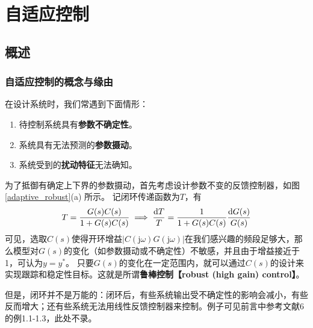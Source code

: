\chapter{自适应控制}\label{cp4}
\section{概述}\label{4Aref}
\subsection{自适应控制的概念与缘由}
在设计系统时，我们常遇到下面情形：
\begin{enumerate}
  \item 待控制系统具有{\textbf{参数不确定性}}。
  
  \item 系统具有无法预测的{\textbf{参数摄动}}。
  
  \item 系统受到的{\bf 扰动特征}无法确知。
\end{enumerate}

为了抵御有确定上下界的参数摄动，首先考虑设计参数不变的反馈控制器，如图 \ref{adaptive_robust}(a) 所示。
  记闭环传递函数为$T$，有\[T=\frac{G(s)C(s)}{1+G(s)C(s)}\implies \frac{\mathop{}\!\mathrm{d} T}{T}=\frac{1}{1+G(s)C(s)}\frac{\mathop{}\!\mathrm{d} G(s)}{G(s)}\]
  可见，选取$C(s)$使得开环增益$|C(\mathrm{j}\omega)G(\mathrm{j}\omega)|$在我们感兴趣的频段足够大，那么模型对$G(s)$的变化（如参数摄动或不确定性）不敏感，并且由于增益接近于1，可认为$y=y^\ast$。
  只要$G(s)$的变化在一定范围内，就可以通过$C(s)$的设计来实现跟踪和稳定性目标。这就是所谓{\bf 鲁棒控制【robust (high gain) control】}。

但是，闭环并不是万能的：闭环后，有些系统输出受不确定性的影响会减小，有些反而增大；还有些系统无法用线性反馈控制器来控制。例子可见前言中参考文献6的例1.1-1.3，此处不录。

